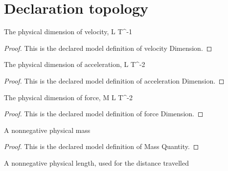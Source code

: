 \section{Declaration topology}
\begin{definition}
  \label{def:physics:phyx-mini-0802:phyxminiproblems-problemphyxmini0802-velocitydimension}
  The physical dimension of velocity, L T\textasciicircum{}-1
\end{definition}
\begin{proof}
  This is the declared model definition of velocity Dimension.
\end{proof}
\begin{definition}
  \label{def:physics:phyx-mini-0802:phyxminiproblems-problemphyxmini0802-accelerationdimension}
  The physical dimension of acceleration, L T\textasciicircum{}-2
\end{definition}
\begin{proof}
  This is the declared model definition of acceleration Dimension.
\end{proof}
\begin{definition}
  \label{def:physics:phyx-mini-0802:phyxminiproblems-problemphyxmini0802-forcedimension}
  The physical dimension of force, M L T\textasciicircum{}-2
\end{definition}
\begin{proof}
  This is the declared model definition of force Dimension.
\end{proof}
\begin{definition}
  \label{def:physics:phyx-mini-0802:phyxminiproblems-problemphyxmini0802-massquantity}
  A nonnegative physical mass
\end{definition}
\begin{proof}
  This is the declared model definition of Mass Quantity.
\end{proof}
\begin{definition}
  \label{def:physics:phyx-mini-0802:phyxminiproblems-problemphyxmini0802-lengthmagnitudequantity}
  A nonnegative physical length, used for the distance travelled
\end{definition}

